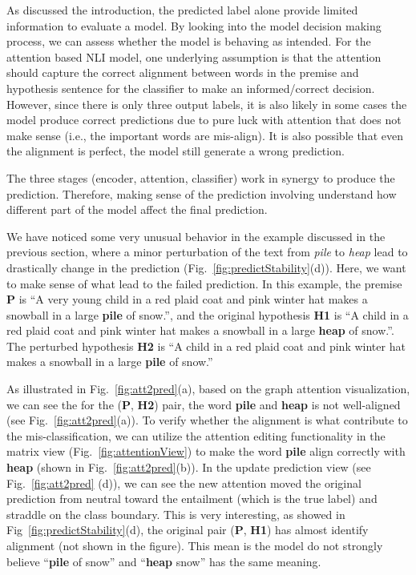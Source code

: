 As discussed the introduction, the predicted label alone provide limited information to evaluate a model. By looking into the model decision making process, we can assess whether the model is behaving as intended. For the attention based NLI model, one underlying assumption is that the attention should capture the correct alignment between words in the premise and hypothesis sentence for the classifier to make an informed/correct decision. However, since there is only three output labels, it is also likely in some cases the model produce correct predictions due to pure luck with attention that does not make sense (i.e., the important words are mis-align). It is also possible that even the alignment is perfect, the model still generate a wrong prediction.

The three stages (encoder, attention, classifier) work in synergy to produce the prediction.
Therefore, making sense of the prediction involving understand how different part of the model affect the final prediction.

We have noticed some very unusual behavior in the example discussed in the previous section,  where a minor perturbation of the text from \emph{pile} to \emph{heap} lead to drastically change in the prediction (Fig.~\ref{fig:predictStability}(d)). Here, we want to make sense of what lead to the failed prediction.  In this example, the premise \textbf{P} is ``A very young child in a red plaid coat and pink winter hat makes a snowball in a large \textbf{pile} of snow.'', and the original hypothesis \textbf{H1} is ``A child in a red plaid coat and pink winter hat makes a snowball in a large \textbf{heap} of snow.''. The perturbed hypothesis \textbf{H2} is ``A child in a red plaid coat and pink winter hat makes a snowball in a large \textbf{pile} of snow.''

As illustrated in Fig.~\ref{fig:att2pred}(a), based on the graph attention visualization, we can see the for the (\textbf{P}, \textbf{H2}) pair, the word \textbf{pile} and \textbf{heap} is not well-aligned (see Fig.~\ref{fig:att2pred}(a)). 
%
To verify whether the alignment is what contribute to the mis-classification, we can utilize the attention editing functionality in the matrix view (Fig.~\ref{fig:attentionView}) to make the word \textbf{pile} align correctly with \textbf{heap} (shown in Fig.~\ref{fig:att2pred}(b)). 
%
In the update prediction view (see Fig.~\ref{fig:att2pred} (d)), we can see the new attention moved the original prediction from neutral toward the entailment (which is the true label) and straddle on the class boundary. This is very interesting, as showed in Fig~\ref{fig:predictStability}(d), the original pair (\textbf{P}, \textbf{H1}) has almost identify alignment (not shown in the figure). This mean is the model do not strongly believe ``\textbf{pile} of snow'' and ``\textbf{heap} snow'' has the same meaning.

